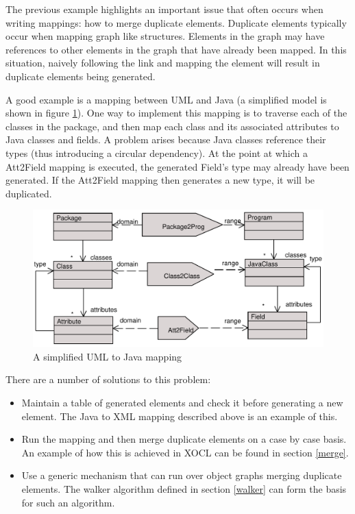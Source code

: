 The previous example highlights an important issue that often
occurs when writing mappings: how to merge duplicate elements.
Duplicate elements typically occur when mapping graph like
structures. Elements in the graph may have references to other
elements in the graph that have already been mapped. In this
situation, naively following the link and mapping the element will
result in duplicate elements being generated.

A good example is a mapping between UML and Java (a simplified
model is shown in figure \ref{umlmapping}). One way to implement
this mapping is to traverse each of the classes in the package,
and then map each class and its associated attributes to Java
classes and fields. A problem arises because Java classes
reference their types (thus introducing a circular dependency). At
the point at which a Att2Field mapping is executed, the generated
Field's type may already have been generated. If the Att2Field
mapping then generates a new type, it will be duplicated.

\begin{figure}[htb]
\begin{center}
\includegraphics[width=12cm]{Mappings/figures/umlmapping.pdf}
\caption{A simplified UML to Java mapping} \label{umlmapping}
\end{center}
\end{figure}

\noindent There are a number of solutions to this problem:

\begin{itemize}
\item Maintain a table of generated elements and check it before
generating a new element. The Java to XML mapping described above
is an example of this. \item Run the mapping and then merge
duplicate elements on a case by case basis. An example of how this
is achieved in XOCL can be found in section \ref{merge}. \item Use
a generic mechanism that can run over object graphs merging
duplicate elements. The walker algorithm defined in section
\ref{walker} can form the basis for such an algorithm.
\end{itemize}

